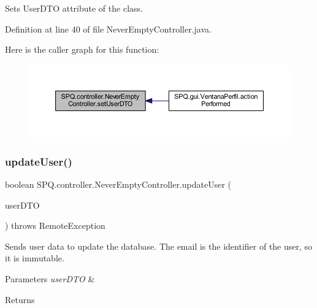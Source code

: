 Sets User\+D\+TO attribute of the class. 

Definition at line 40 of file Never\+Empty\+Controller.\+java.

Here is the caller graph for this function\+:\nopagebreak
\begin{figure}[H]
\begin{center}
\leavevmode
\includegraphics[width=350pt]{class_s_p_q_1_1controller_1_1_never_empty_controller_a847c0288b7c18327d81c092f8c234d01_icgraph}
\end{center}
\end{figure}
\mbox{\label{class_s_p_q_1_1controller_1_1_never_empty_controller_abac74fe36817d476abdd20d19df2092b}} 
\subsubsection{\texorpdfstring{update\+User()}{updateUser()}}
{\footnotesize\ttfamily boolean S\+P\+Q.\+controller.\+Never\+Empty\+Controller.\+update\+User (\begin{DoxyParamCaption}\item[{\mbox{\hyperlink{class_s_p_q_1_1dto_1_1_user_d_t_o}{User\+D\+TO}}}]{user\+D\+TO }\end{DoxyParamCaption}) throws Remote\+Exception}

Sends user data to update the database. The email is the identifier of the user, so it is immutable. 
\begin{DoxyParams}{Parameters}
{\em user\+D\+TO} & \\
\hline
\end{DoxyParams}
\begin{DoxyReturn}{Returns}

\end{DoxyReturn}

